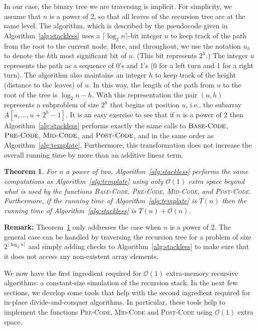 \documentclass{elsart}
\newcommand{\Oh}[1]{\ensuremath{\mathcal{O}(#1)}}
\newtheorem{theorem}{Theorem}
\begin{document}
In our case, the binary tree we are traversing is implicit.  For
simplicity, we assume that $n$ is a power of 2, so that all leaves of
the recursion tree are at the same level.  The algorithm, which is
described by the pseudocode given in Algorithm~\ref{alg:stackless} uses a
$\lceil\log_2 n\rceil$-bit integer $u$ to keep track of the path from
the root to the current node.  Here, and throughout, we use the
notation $u_h$ to denote the $h$th most significant bit of $u$.  (This
bit represents $2^h$.) The integer $u$ represents the path as a sequence
of 0's and 1's (0 for a left turn and 1 for a right turn).  The
algorithm also maintains an integer $h$ to keep track of the height
(distance to the leaves) of $u$.  In this way, the length of the path
from $u$ to the root of the tree is $\log_2 n - h$.  With this
representation the pair $(u,h)$ represents a subproblem of size $2^h$
that begins at position $u$, i.e., the subarray $A[u,\ldots,u+2^h-1]$.
It is an easy exercise \cite[Exercise~10.4-5]{cormen:alg} to see that if $n$ is a power of 2
then Algorithm~\ref{alg:stackless} performs exactly the same calls to
$\textsc{Base-Code}$, $\textsc{Pre-Code}$, $\textsc{Mid-Code}$, and
$\textsc{Post-Code}$, and in the same order as
Algorithm~\ref{alg:template}. Furthermore, this transformation does not
increase the overall running time by more than an additive linear term.

\begin{theorem}\label{thm:stackless}
For $n$ a power of two, Algorithm~\ref{alg:stackless} performs the same
computations as Algorithm~\ref{alg:template} using only $\Oh{1}$ extra
space beyond what is used by the functions \textsc{Base-Code},
\textsc{Pre-Code}, \textsc{Mid-Code}, and \textsc{Post-Code}.
Furthermore, if the running time of Algorithm~\ref{alg:template} is
$T(n)$ then the running time of Algorithm~\ref{alg:stackless} is
$T(n)+\Oh{n}$.
\end{theorem}

\noindent\textbf{Remark:}  Theorem~\ref{thm:stackless} only addresses
the case when $n$ is a power of 2. The general case can be handled by
traversing the recursion tree for a problem of size $2^{\lceil\log_2
n\rceil}$ and simply adding checks to Algorithm~\ref{alg:stackless} to
make sure that it does not access any non-existent array elements.

We now have the first ingredient required for \Oh{1} extra-memory
recursive algorithms: a constant-size simulation of the recursion
stack.  In the next few sections, we develop some tools that help with
the second ingredient required for in-place divide-and-conquer
algorithms.  In particular, these tools help to implement the
functions \textsc{Pre-Code}, \textsc{Mid-Code} and \textsc{Post-Code}
using $\Oh{1}$ extra space.
\end{document}
